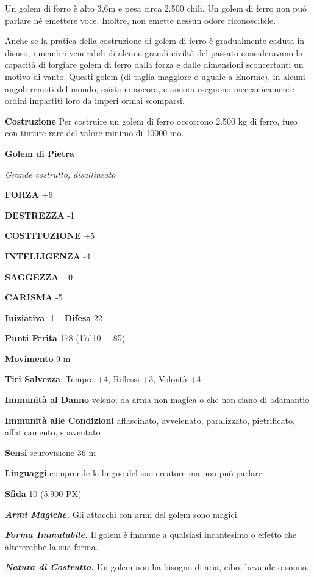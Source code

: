 \begin{multicols}{2}
	Un golem di ferro è alto 3,6m e pesa circa 2.500 chili. Un golem di ferro non può parlare né emettere voce. Inoltre, non emette nessun odore riconoscibile.

	Anche se la pratica della costruzione di golem di ferro è gradualmente caduta in disuso, i membri venerabili di alcune grandi civiltà del passato consideravano la capacità di forgiare golem di ferro dalla forza e dalle dimensioni sconcertanti un motivo di vanto. Questi golem (di taglia maggiore o uguale a Enorme), in alcuni angoli remoti del mondo, esistono ancora, e ancora eseguono meccanicamente ordini impartiti loro da imperi ormai scomparsi.

	\textbf{Costruzione}
	Per costruire un golem di ferro occorrono 2.500 kg di ferro, fuso con tinture rare del valore minimo di 10000 mo.


	\medskip{}\textbf{Golem di Pietra}

	\textit{Grande costrutto, disallineato}

	\textbf{FORZA} +6

	\textbf{DESTREZZA} -1

	\textbf{COSTITUZIONE} +5

	\textbf{INTELLIGENZA} -4

	\textbf{SAGGEZZA} +0

	\textbf{CARISMA} -5

	\textbf{Iniziativa} -1 -- \textbf{Difesa} 22

	\textbf{Punti Ferita} 178 (17d10 + 85)

	\textbf{Movimento} 9 m

	\textbf{Tiri Salvezza}: Tempra +4, Riflessi +3, Volontà +4

	\textbf{Immunità al Danno} veleno; da arma non magica o che non siano di adamantio

	\textbf{Immunità alle Condizioni} affascinato, avvelenato, paralizzato, pietrificato, affaticamento, spaventato

	\textbf{Sensi} scurovisione 36 m

	\textbf{Linguaggi} comprende le lingue del suo creatore ma non può parlare

	\textbf{Sfida} 10 (5.900 PX)

	\textit{\textbf{Armi Magiche.}} Gli attacchi con armi del golem sono magici.

	\textit{\textbf{Forma Immutabile.}} Il golem è immune a qualsiasi incantesimo o effetto che altererebbe la sua forma.

	\textit{\textbf{Natura di Costrutto.}} Un golem non ha bisogno di aria, cibo, bevande o sonno.


\end{multicols}
